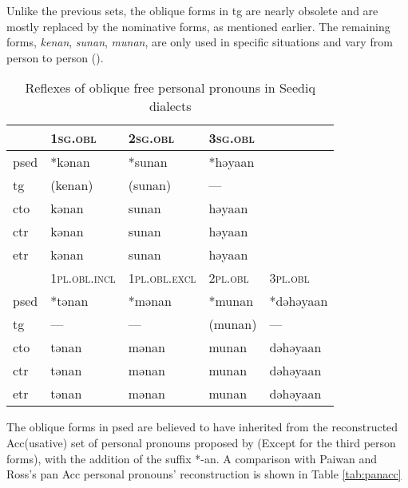 Unlike the previous sets, the oblique forms in \acl{tg} are nearly obsolete and are mostly replaced by the nominative forms, as mentioned earlier. The remaining forms, \textit{kenan}, \textit{sunan}, \textit{munan}, are only used in specific situations and vary from person to person (\cite{Sung2018Sedgrammar}).

\begin{table}[!htbp]
\centering
\caption{Reflexes of oblique free personal pronouns in Seediq dialects}
\label{tab:oblfree}
\begin{tabular}{lllll}
\hline
      & \textsc{1sg.obl}      & \textsc{2sg.obl}      & \textsc{3sg.obl} &           \\ \hline
\acs{psed} & *kənan       & *sunan       & *həyaan &           \\
\acs{tg}  & (kenan)      & (sunan)      & ---     &           \\
\acs{cto}  & kənan        & sunan        & həyaan  &           \\
\acs{ctr} & kənan        & sunan        & həyaan  &           \\
\acs{etr} & kənan        & sunan        & həyaan  &           \\ \hline
      & \textsc{1pl.obl.incl} & \textsc{1pl.obl.excl} & \textsc{2pl.obl} & \textsc{3pl.obl}   \\ \hline
\acs{psed} & *tənan       & *mənan       & *munan  & *dəhəyaan \\
\acs{tg}  & ---          & ---          & (munan) & ---       \\
\acs{cto}  & tənan        & mənan        & munan   & dəhəyaan  \\
\acs{ctr} & tənan        & mənan        & munan   & dəhəyaan  \\
\acs{etr} & tənan        & mənan        & munan   & dəhəyaan  \\ \hline
\end{tabular}
\end{table}

The oblique forms in \acl{psed} are believed to have inherited from the reconstructed Acc(usative) set of personal pronouns proposed by \textcite{ross2006casepronoun} (Except for the third person forms), with the addition of the suffix *-an. A comparison with Paiwan and Ross's \acs{pan} Acc personal pronouns' reconstruction is shown in Table \ref{tab:panacc}

